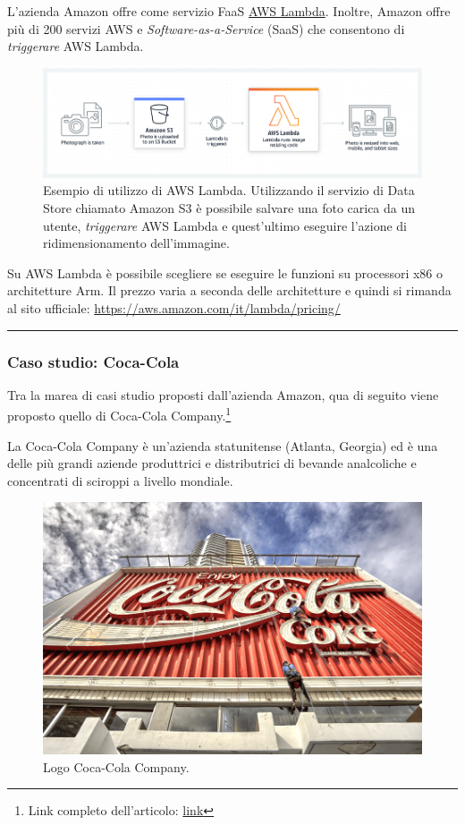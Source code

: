 \documentclass[a4paper]{article}
\newcommand{\longline}{\noindent\rule{\textwidth}{0.4pt}}
\begin{document}
	L'azienda Amazon offre come servizio FaaS \href{https://aws.amazon.com/lambda/?nc2=h_ql_prod_fs_lbd}{AWS Lambda}. Inoltre, Amazon offre più di 200 servizi AWS e \emph{Software-as-a-Service} (SaaS) che consentono di \emph{triggerare} AWS Lambda.
	\begin{figure}[!htp]
		\centering
		\includegraphics[width=\textwidth]{img/AWS-Lambda-1.png}
		\caption{Esempio di utilizzo di AWS Lambda. Utilizzando il servizio di Data Store chiamato Amazon S3 è possibile salvare una foto carica da un utente, \emph{triggerare} AWS Lambda e quest'ultimo eseguire l'azione di ridimensionamento dell'immagine.}
	\end{figure}
	
	\noindent
	Su AWS Lambda è possibile scegliere se eseguire le funzioni su processori x86 o architetture Arm. Il prezzo varia a seconda delle architetture e quindi si rimanda al sito ufficiale: \url{https://aws.amazon.com/it/lambda/pricing/}
	
	\longline
	
	\subsubsection{Caso studio: Coca-Cola}
	
	Tra la marea di casi studio proposti dall'azienda Amazon, qua di seguito viene proposto quello di Coca-Cola Company.\footnote{Link completo dell'articolo: \href{https://aws.amazon.com/solutions/case-studies/coca-cola-freestyle/?nc1=h_ls}{link}}\newline
	
	\noindent
	La Coca-Cola Company è un'azienda statunitense (Atlanta, Georgia) ed è una delle più grandi aziende produttrici e distributrici di bevande analcoliche e concentrati di sciroppi a livello mondiale.
	\begin{figure}[!htp]
		\centering
		\includegraphics[width=.58\textwidth]{img/Coca-Cola-1.png}
		\caption{Logo Coca-Cola Company.}
	\end{figure}\newpage
	
\end{document}
